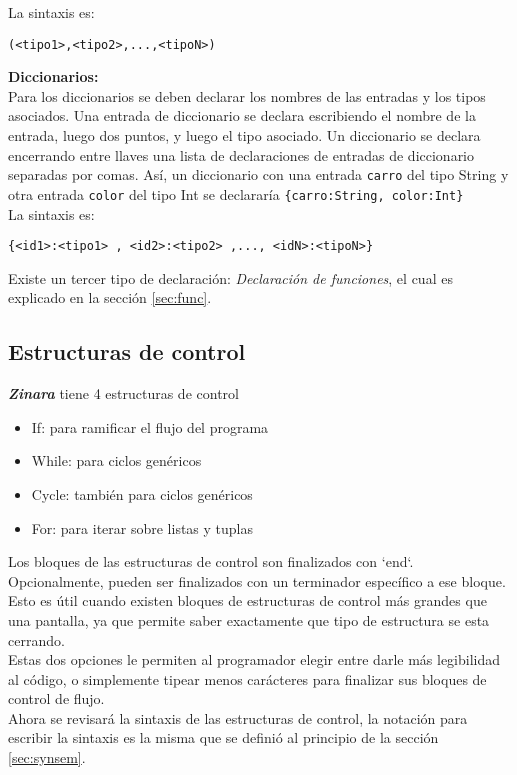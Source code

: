 \documentclass[12pt, spanish]{report}
\begin{document}
La sintaxis es:
\begin{verbatim}
(<tipo1>,<tipo2>,...,<tipoN>)
\end{verbatim}

\textbf{Diccionarios:}\\
Para los diccionarios se deben declarar los nombres de las entradas y
los tipos asociados. Una entrada de diccionario se declara escribiendo
el nombre de la entrada, luego dos puntos, y luego el tipo
asociado. Un diccionario se declara encerrando entre llaves una lista
de declaraciones de entradas de diccionario separadas por
comas. As\'i, un diccionario con una entrada \texttt{carro} del tipo
String y otra entrada \texttt{color} del tipo Int se declarar\'ia
\texttt{\{carro:String, color:Int\}}\\

La sintaxis es:
\begin{verbatim}
{<id1>:<tipo1> , <id2>:<tipo2> ,..., <idN>:<tipoN>}
\end{verbatim}

Existe un tercer tipo de declaraci\'on: \emph{Declaraci\'on de funciones},
el cual es explicado en la secci\'on \ref{sec:func}.

\subsection{Estructuras de control}
\label{sec:ecntrl}
\emph{\textbf{Zinara}} tiene 4 estructuras de control
\begin{itemize}
\item If: para ramificar el flujo del programa
\item While: para ciclos gen\'ericos
\item Cycle: tambi\'en para ciclos gen\'ericos
\item For: para iterar sobre listas y tuplas
\end{itemize}

Los bloques de las estructuras de control son finalizados
con `end`. Opcionalmente, pueden ser finalizados con un terminador
espec\'ifico a ese bloque. Esto es \'util cuando existen bloques de
estructuras de control m\'as grandes que una pantalla, ya que permite
saber exactamente que tipo de estructura se esta cerrando.\\
\indent Estas dos opciones le permiten al programador elegir entre darle m\'as
legibilidad al c\'odigo, o simplemente tipear menos car\'acteres para
finalizar sus bloques de control de flujo.\\
\indent Ahora se revisar\'a la sintaxis de las estructuras de control,
la notaci\'on para escribir la sintaxis es la misma que se defini\'o al
principio de la secci\'on \ref{sec:synsem}.
\end{document}
